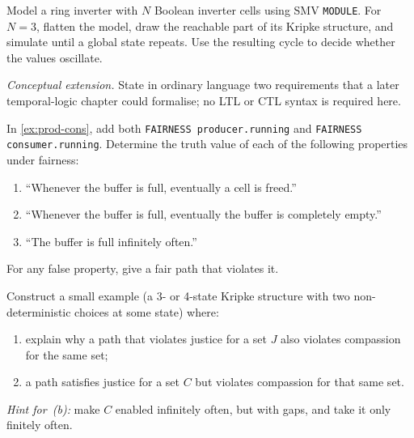 \begin{chapex}
Model a ring inverter with $N$ Boolean inverter cells using SMV
\texttt{MODULE}.  For $N=3$, flatten the model, draw the reachable part of
its Kripke structure, and simulate until a global state repeats.  Use the
resulting cycle to decide whether the values oscillate.

\emph{Conceptual extension.}  State in ordinary language two requirements
that a later temporal-logic chapter could formalise; no LTL or CTL syntax is
required here.
\end{chapex}

\begin{chapex}[Fairness]
In \cref{ex:prod-cons}, add both \texttt{FAIRNESS producer.running}
and \texttt{FAIRNESS consumer.running}.  Determine the truth value of
each of the following properties under fairness:
\begin{enumerate}[nosep,label=(\alph*)]
  \item ``Whenever the buffer is full, eventually a cell is freed.''
  \item ``Whenever the buffer is full, eventually the buffer is
        completely empty.''
  \item ``The buffer is full infinitely often.''
\end{enumerate}
For any false property, give a fair path that violates it.
\end{chapex}

\begin{chapex}
Construct a small example (a 3- or 4-state Kripke structure with
two non-deterministic choices at some state) where:
\begin{enumerate}[nosep,label=(\alph*)]
  \item explain why a path that violates justice for a set $J$ also
        violates compassion for the same set;
  \item a path satisfies justice for a set $C$ but violates compassion
        for that same set.
\end{enumerate}
\emph{Hint for~(b):} make $C$ enabled infinitely often, but with gaps, and
take it only finitely often.
\end{chapex}
